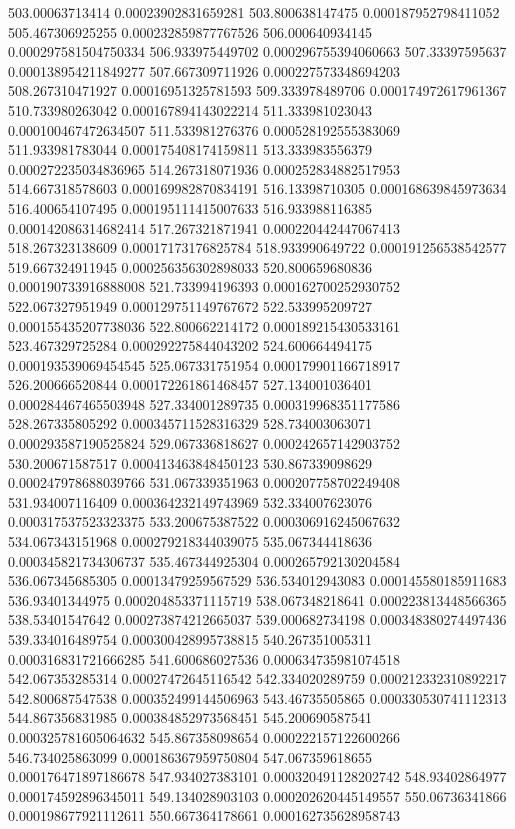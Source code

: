 {503.00063713414 0.00023902831659281
503.800638147475 0.000187952798411052
505.467306925255 0.000232859877767526
506.000640934145 0.000297581504750334
506.933975449702 0.000296755394060663
507.33397595637 0.000138954211849277
507.667309711926 0.000227573348694203
508.267310471927 0.00016951325781593
509.333978489706 0.000174972617961367
510.733980263042 0.000167894143022214
511.333981023043 0.000100467472634507
511.533981276376 0.000528192555383069
511.933981783044 0.000175408174159811
513.333983556379 0.000272235034836965
514.267318071936 0.000252834882517953
514.667318578603 0.000169982870834191
516.13398710305 0.000168639845973634
516.400654107495 0.000195111415007633
516.933988116385 0.000142086314682414
517.267321871941 0.000220442447067413
518.267323138609 0.00017173176825784
518.933990649722 0.000191256538542577
519.667324911945 0.000256356302898033
520.800659680836 0.000190733916888008
521.733994196393 0.000162700252930752
522.067327951949 0.000129751149767672
522.533995209727 0.000155435207738036
522.800662214172 0.000189215430533161
523.467329725284 0.000292275844043202
524.600664494175 0.000193539069454545
525.067331751954 0.000179901166718917
526.200666520844 0.000172261861468457
527.134001036401 0.000284467465503948
527.334001289735 0.000319968351177586
528.267335805292 0.000345711528316329
528.734003063071 0.000293587190525824
529.067336818627 0.000242657142903752
530.200671587517 0.000413463848450123
530.867339098629 0.000247978688039766
531.067339351963 0.000207758702249408
531.934007116409 0.000364232149743969
532.334007623076 0.000317537523323375
533.200675387522 0.000306916245067632
534.067343151968 0.000279218344039075
535.067344418636 0.000345821734306737
535.467344925304 0.000265792130204584
536.067345685305 0.00013479259567529
536.534012943083 0.000145580185911683
536.93401344975 0.000204853371115719
538.067348218641 0.000223813448566365
538.53401547642 0.000273874212665037
539.000682734198 0.000348380274497436
539.334016489754 0.000300428995738815
540.267351005311 0.000316831721666285
541.600686027536 0.000634735981074518
542.067353285314 0.00027472645116542
542.334020289759 0.000212332310892217
542.800687547538 0.000352499144506963
543.46735505865 0.000330530741112313
544.867356831985 0.000384852973568451
545.200690587541 0.000325781605064632
545.867358098654 0.000222157122600266
546.734025863099 0.000186367959750804
547.067359618655 0.000176471897186678
547.934027383101 0.000320491128202742
548.93402864977 0.000174592896345011
549.134028903103 0.000202620445149557
550.06736341866 0.000198677921112611
550.667364178661 0.000162735628958743
}
